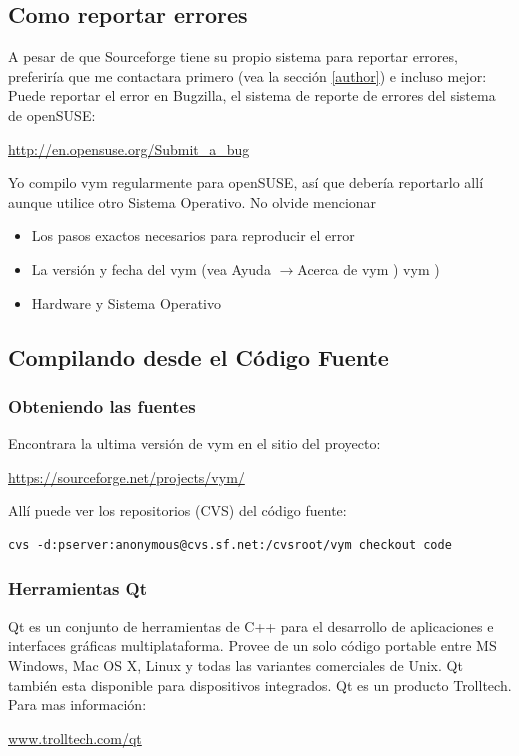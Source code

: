 \documentclass{article}
\newcommand{\vym}{{\sc vym }}
\newcommand{\ra}{$\longrightarrow$}
\begin{document}
\begin{appendix}
\subsection{Como reportar errores}
A pesar de que Sourceforge tiene su propio sistema para reportar errores, preferir\'ia que me contactara primero (vea la secci\'on \ref{author}) e incluso mejor: Puede reportar el error en Bugzilla, el sistema de reporte de errores del sistema de openSUSE:
\begin{center}
\href{http://en.opensuse.org/Submit_a_bug}{http://en.opensuse.org/Submit\_a\_bug}
\end{center}
Yo compilo \vym regularmente para openSUSE, as\'i que deber\'ia reportarlo all\'i aunque utilice otro Sistema Operativo. No olvide mencionar
\begin{itemize}
	\item Los pasos exactos necesarios para reproducir el error
	\item La versi\'on y fecha del \vym (vea Ayuda \ra Acerca de \vym)
	\vym)
	\item Hardware y Sistema Operativo
\end{itemize}

\subsection{Compilando desde el C\'odigo Fuente}
\subsubsection{Obteniendo las fuentes} \label{getsources}
Encontrara la ultima versi\'on de \vym en el sitio del proyecto:
\begin{center}
\href{https://sourceforge.net/projects/vym/}{https://sourceforge.net/projects/vym/}
\end{center}
All\'i puede ver los repositorios (CVS) del c\'odigo fuente:

\begin{verbatim}
cvs -d:pserver:anonymous@cvs.sf.net:/cvsroot/vym checkout code
\end{verbatim}

\subsubsection{Herramientas Qt}
Qt es un conjunto de herramientas de C++ para el desarrollo de aplicaciones e interfaces gr\'aficas multiplataforma. Provee de un solo c\'odigo portable entre MS Windows, Mac OS X, Linux y todas las variantes comerciales de Unix. Qt tambi\'en esta disponible para dispositivos integrados. Qt es un producto Trolltech. Para mas informaci\'on:
\begin{center}
\href{http://www.trolltech.com/qt/}{www.trolltech.com/qt} 
\end{center}



\end{appendix}
\end{document}

